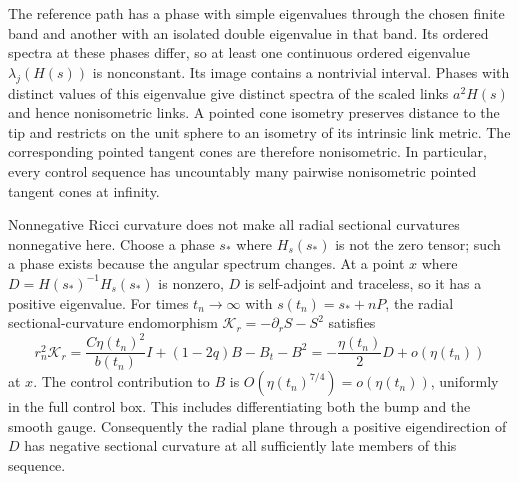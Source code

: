The reference path has a phase with simple eigenvalues through the chosen
finite band and another with an isolated double eigenvalue in that band.
Its ordered spectra at these phases differ, so at least one continuous
ordered eigenvalue $\lambda_j(H(s))$ is nonconstant. Its image contains a
nontrivial interval. Phases with distinct values of this eigenvalue give
distinct spectra of the scaled links $a^2H(s)$ and hence nonisometric
links. A pointed cone isometry preserves distance to the tip and restricts
on the unit sphere to an isometry of its intrinsic link metric. The
corresponding pointed tangent cones are therefore nonisometric. In
particular, every control sequence has uncountably many pairwise
nonisometric pointed tangent cones at infinity.

Nonnegative Ricci curvature does not make all radial sectional curvatures
nonnegative here.  Choose a phase $s_*$ where $H_s(s_*)$ is not the zero
tensor; such a phase exists because the angular spectrum changes.  At a
point $x$ where $D=H(s_*)^{-1}H_s(s_*)$ is nonzero, $D$ is self-adjoint
and traceless, so it has a positive eigenvalue.  For times $t_n\to\infty$
with $s(t_n)=s_*+nP$, the radial sectional-curvature endomorphism
$\mathcal K_r=-\partial_rS-S^2$ satisfies
\[
 r_n^2\mathcal K_r
  =\frac{C\eta(t_n)^2}{b(t_n)}I
    +(1-2q)B-B_t-B^2
  =-\frac{\eta(t_n)}2D+o(\eta(t_n))
\]
at $x$.  The control contribution to $B$ is
$O(\eta(t_n)^{7/4})=o(\eta(t_n))$, uniformly in the full control
box. This includes differentiating both the bump and the smooth gauge.  Consequently the radial plane
through a positive eigendirection of $D$ has negative sectional curvature
at all sufficiently late members of this sequence.
